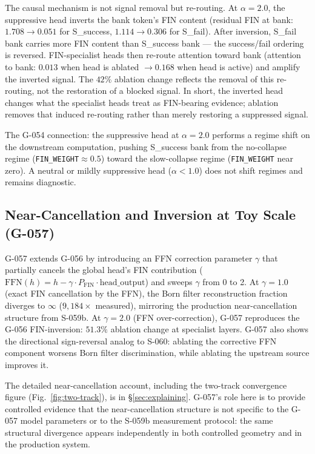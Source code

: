 The causal mechanism is not signal removal but re-routing.
At $\alpha=2.0$, the suppressive head inverts the bank token's FIN content (residual FIN
at bank: $1.708 \to 0.051$ for S\_success, $1.114 \to 0.306$ for S\_fail).
After inversion, S\_fail bank carries more FIN content than S\_success bank --- the
success/fail ordering is reversed.
FIN-specialist heads then re-route attention toward bank (attention to bank: $0.013$
when head is ablated $\to 0.168$ when head is active) and amplify the inverted signal.
The $42\%$ ablation change reflects the removal of this re-routing, not the restoration
of a blocked signal.
In short, the inverted head changes what the specialist heads treat as FIN-bearing
evidence; ablation removes that induced re-routing rather than merely restoring a
suppressed signal.

The G-054 connection: the suppressive head at $\alpha=2.0$ performs a regime shift
on the downstream computation, pushing S\_success bank from the no-collapse regime
(\texttt{FIN\_WEIGHT}$\approx 0.5$) toward the slow-collapse regime (\texttt{FIN\_WEIGHT}
near zero).
A neutral or mildly suppressive head ($\alpha < 1.0$) does not shift regimes and
remains diagnostic.

\subsection{Near-Cancellation and Inversion at Toy Scale (G-057)}

G-057 extends G-056 by introducing an FFN correction parameter $\gamma$ that partially
cancels the global head's FIN contribution
($\mathrm{FFN}(h) = h - \gamma \cdot P_\text{FIN} \cdot \mathrm{head\_output}$)
and sweeps $\gamma$ from 0 to 2.
At $\gamma=1.0$ (exact FIN cancellation by the FFN), the Born filter reconstruction
fraction diverges to $\infty$ ($9{,}184\times$ measured), mirroring the production
near-cancellation structure from S-059b.
At $\gamma=2.0$ (FFN over-correction), G-057 reproduces the G-056 FIN-inversion:
$51.3\%$ ablation change at specialist layers.
G-057 also shows the directional sign-reversal analog to S-060: ablating the corrective
FFN component worsens Born filter discrimination, while ablating the upstream source
improves it.

The detailed near-cancellation account, including the two-track convergence figure
(Fig.~\ref{fig:two-track}), is in \S\ref{sec:explaining}.
G-057's role here is to provide controlled evidence that the near-cancellation structure
is not specific to the G-057 model parameters or to the S-059b measurement protocol:
the same structural divergence appears independently in both controlled geometry and in
the production system.

